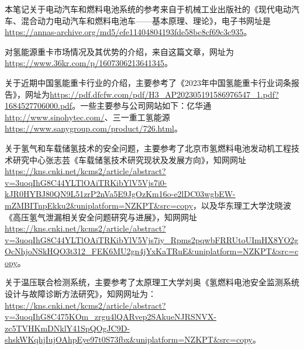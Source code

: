 \documentclass[UTF8,a4paper,11pt]{article}
\begin{document}
本笔记关于电动汽车和燃料电池系统的参考来自于机械工业出版社的《现代电动汽车、混合动力电动汽车和燃料电池车——基本原理、理论》，电子书网址是\url{https://annas-archive.org/md5/efe11404804193fde58bc8cf69c3c935}。

对氢能源重卡市场情况及其优势的介绍，来自这篇文章，网址为\url{https://www.36kr.com/p/1607306213641345}。

关于近期中国氢能重卡行业的介绍，主要参考了《2023年中国氢能重卡行业词条报告》，网址为\url{https://pdf.dfcfw.com/pdf/H3_AP202305191586976547_1.pdf?1684527706000.pdf}。一些主要参与公司网站如下：亿华通\url{http://www.sinohytec.com/}、三一重工氢能源\url{https://www.sanygroup.com/product/726.html}。

关于氢气和车载储氢技术的安全问题，主要参考了北京市氢燃料电池发动机工程技术研究中心张志芸《车载储氢技术研究现状及发展方向》，知网网址\url{https://kns.cnki.net/kcms2/article/abstract?v=3uoqIhG8C44YLTlOAiTRKibYlV5Vjs7i0-kJR0HYBJ80QN9L51zrP2nVa5E9JgOzKm16o-e2lDC03wgbEW-mZMBITnpEkku2&uniplatform=NZKPT&src=copy}，以及华东理工大学沈晓波《高压氢气泄漏相关安全问题研究与进展》，知网网址\url{https://kns.cnki.net/kcms2/article/abstract?v=3uoqIhG8C44YLTlOAiTRKibYlV5Vjs7iy_Rpms2pqwbFRRUtoUImHX8YO2gOcNhjoNSkHQO3t312_FEK6MU2gn4jYxKaTRuE&uniplatform=NZKPT&src=copy}。

关于温压联合检测系统，主要参考了太原理工大学刘奥《氢燃料电池安全监测系统设计与故障诊断方法研究》，知网网址为：\url{https://kns.cnki.net/kcms2/article/abstract?v=3uoqIhG8C475KOm_zrgu4lQARvep2SAkueNJRSNVX-zc5TVHKmDNklY41SpQOgJC9D-shskWKqhjIujOAhpEye97t0S73fbx&uniplatform=NZKPT&src=copy}。
\end{document}
